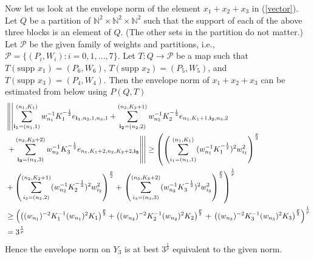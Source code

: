 \documentclass[12pt]{amsart}
\theoremstyle{definition}
\theoremstyle{remark}
\numberwithin{equation}{section}
\begin{document}
Now let us look at the envelope norm of the element $x_1+x_2+x_3$ in (\ref{vector}).\\ 

Let $Q$ be a partition of 
 ${\mathbb{N}}^2 \times {\mathbb{N}}^2\times {\mathbb{N}}^2$
 such that the support of each of the above three blocks is an 
element of $Q$. (The other sets in the partition do not matter.)
Let $\mathcal{P}$ be the given family of weights and partitions, i.e., 
${\mathcal{P}}=\{ (P_i,W_i): i=0,1,...,7\}$. 
Let $T: Q\rightarrow \mathcal{P}$ be a map such that
$T(\text{supp }x_1)=(P_6,W_6)$, 
$T(\text{supp }x_2)=(P_5,W_5)$, and
$T(\text{supp }x_3)=(P_4,W_4)$. 
Then the envelope norm of $x_1+x_2+x_3$ can be 
estimated from below using $P(Q, T)$ 
\begin{align*}
&\left\|\left|\sum_{{\bf{i_1}}=(n_1,1)}^{(n_1,K_1)}
 w_{n_1}^{-1}K_{1}^{-\frac{1}{2}}
 e_{{\bf{i_1}},n_2,1,n_3,1}
+\sum_{{\bf{i_2}}=(n_2,2)}^{(n_2,K_2+1)} 
w_{n_2}^{-1}K_{2}^{-\frac{1}{2}}
 e_{n_1,K_1+1,{\bf{i_2}},n_3,2}\right .\right .\\
&\left .\left.+\sum_{{\bf{i_3}}=(n_3,3)}^{(n_3,K_3+2)}
  w_{n_3}^{-1}K_{3}^{-\frac{1}{2}}
 e_{n_1,K_1+2,n_2,K_2+2,{\bf{i_3}}}\right\|\right|
\ge\left( \left(\sum_{i_1=(n_1,1)}^{(n_1,
 K_1)}(w_{n_1}^{-1}K_{1}^{-\frac{1}{2}})^2
w_{i_1}^{2}\right)^{\frac p 2}\right .\\
&+\left(\sum_{i_2=(n_2,2)}^{(n_2,
 K_2+1)}(w_{n_2}^{-1}K_{2}^{-\frac{1}{2}})^2
w_{i_2}^{2}\right)^{\frac p 2}
+\left.\left(\sum_{i_3=(n_3,3)}^{(n_3,
 K_3+2)}(w_{n_3}^{-1}K_{3}^{-\frac{1}{2}})^2
w_{i_3}^{2}\right)^{\frac p 2}\right)^{\frac 1 p}\\
&\ge
\left(\left((w_{n_1})^{-2}K_{1}^{-1}(w_{n_1})^{2}K_1\right)^{\frac p
    2}
+\left((w_{n_2})^{-2}K_{2}^{-1}(w_{n_2})^{2}K_2\right)^{\frac p
 2}\right .
+\left .\left((w_{n_3})^{-2}K_{3}^{-1}(w_{n_3})^{2}K_3\right)^{\frac
 p 2}
\right)^{\frac 1 p}\\
&= 3^{\frac{1}{p}}
\end{align*}
Hence the envelope norm on $Y_3$ is at best $3^{\frac 1 p}$ 
equivalent to the given norm.\\
\end{document}
